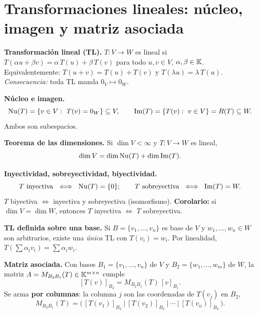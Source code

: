 \section{Transformaciones lineales: núcleo, imagen y matriz asociada}

\begin{teoria}
\textbf{Transformación lineal (TL).} $T:V\to W$ es lineal si $T(\alpha u+\beta v)=\alpha\,T(u)+\beta\,T(v)$ para todo $u,v\in V$, $\alpha,\beta\in\mathbb{K}$. Equivalentemente: $T(u+v)=T(u)+T(v)$ y $T(\lambda u)=\lambda\,T(u)$. \emph{Consecuencia:} toda TL manda $0_V\mapsto 0_W$.

\smallskip
\noindent\textbf{Núcleo e imagen.}
\[
\operatorname{Nu}(T)=\{v\in V:\ T(v)=0_W\}\subseteq V,\qquad
\operatorname{Im}(T)=\{T(v):\ v\in V\}=R(T)\subseteq W.
\]
Ambos son subespacios.

\smallskip
\noindent\textbf{Teorema de las dimensiones.} Si $\dim V<\infty$ y $T:V\to W$ es lineal,
\[
\dim V=\dim\operatorname{Nu}(T)+\dim\operatorname{Im}(T).
\]

\smallskip
\noindent\textbf{Inyectividad, sobreyectividad, biyectividad.}
\[
T\ \text{inyectiva}\ \iff\ \operatorname{Nu}(T)=\{0\};\qquad
T\ \text{sobreyectiva}\ \iff\ \operatorname{Im}(T)=W.
\]
$T$ biyectiva $\iff$ inyectiva y sobreyectiva (isomorfismo). \textbf{Corolario:} si $\dim V=\dim W$, entonces $T$ inyectiva $\iff$ $T$ sobreyectiva.

\smallskip
\noindent\textbf{TL definida sobre una base.} Si $B=\{v_1,\dots,v_n\}$ es base de $V$ y $w_1,\dots,w_n\in W$ son arbitrarios, existe una \emph{única} TL con $T(v_i)=w_i$. Por linealidad, $T\!\left(\sum\alpha_i v_i\right)=\sum\alpha_i w_i$.

\smallskip
\noindent\textbf{Matriz asociada.} Con bases $B_1=\{v_1,\dots,v_n\}$ de $V$ y $B_2=\{w_1,\dots,w_m\}$ de $W$, la matriz $A=M_{B_2B_1}(T)\in\mathbb{K}^{m\times n}$ cumple
\[
[T(v)]_{B_2}=M_{B_2B_1}(T)\,[v]_{B_1}.
\]
Se arma \textbf{por columnas}: la columna $j$ son las coordenadas de $T(v_j)$ en $B_2$,
\[
M_{B_2B_1}(T)=\Big(\,[T(v_1)]_{B_2}\ \big|\ [T(v_2)]_{B_2}\ \big|\ \cdots\ \big|\ [T(v_n)]_{B_2}\,\Big).
\]
\end{teoria}

